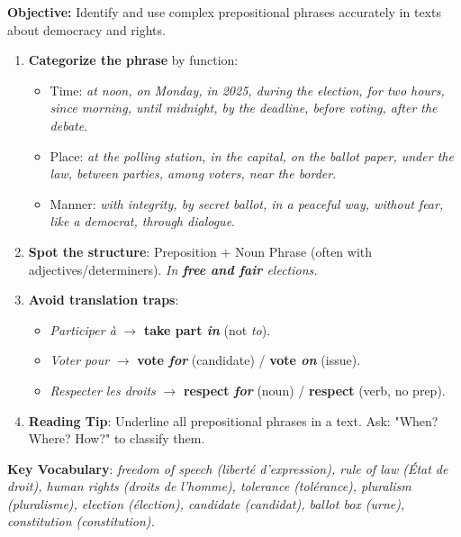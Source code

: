 \documentclass[11pt]{article}
\newcommand{\cle}[1]{{\popxbold\color{popdark}#1}}
\begin{document}
\begin{methode}
    \textbf{Objective:} Identify and use complex prepositional phrases accurately in texts about democracy and rights.
    \begin{enumerate}
        \item \textbf{Categorize the phrase} by function:
              \begin{itemize}
                  \item \cle{Time}: \emph{at noon, on Monday, in 2025, during the election, for two hours, since morning, until midnight, by the deadline, before voting, after the debate}.
                  \item \cle{Place}: \emph{at the polling station, in the capital, on the ballot paper, under the law, between parties, among voters, near the border}.
                  \item \cle{Manner}: \emph{with integrity, by secret ballot, in a peaceful way, without fear, like a democrat, through dialogue}.
              \end{itemize}
        \item \textbf{Spot the structure}: Preposition + Noun Phrase (often with adjectives/determiners). \textit{In \textbf{free and fair} elections.}
        \item \textbf{Avoid translation traps}:
              \begin{itemize}
                  \item \textit{Participer à} $\to$ \textbf{take part \emph{in}} (not \emph{to}).
                  \item \textit{Voter pour} $\to$ \textbf{vote \emph{for}} (candidate) / \textbf{vote \emph{on}} (issue).
                  \item \textit{Respecter les droits} $\to$ \textbf{respect \emph{for}} (noun) / \textbf{respect} (verb, no prep).
              \end{itemize}
        \item \textbf{Reading Tip}: Underline all prepositional phrases in a text. Ask: "When? Where? How?" to classify them.
    \end{enumerate}
    \textbf{Key Vocabulary}: \textit{freedom of speech (liberté d'expression), rule of law (État de droit), human rights (droits de l'homme), tolerance (tolérance), pluralism (pluralisme), election (élection), candidate (candidat), ballot box (urne), constitution (constitution).}
\end{methode}
\end{document}
